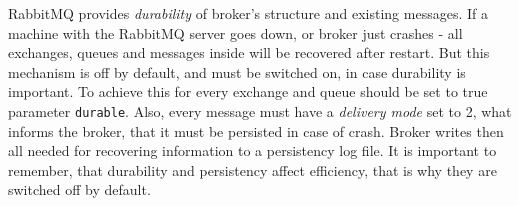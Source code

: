 RabbitMQ provides \textit{durability}  of broker's structure and existing messages.
If a machine with the RabbitMQ server goes down, or broker just crashes - all exchanges, queues and messages inside will be recovered after restart.
But this mechanism is off by default, and must be switched on, in case durability is important.
To achieve this for every exchange and queue should be set to true parameter \lstinline{durable}.
Also, every message must have a \textit{delivery mode} set to 2, what informs the broker, that it must be persisted in case of crash.
Broker writes then all needed for recovering information to a persistency log file.
It is important to remember, that durability and persistency affect efficiency, that is why they are switched off by default.